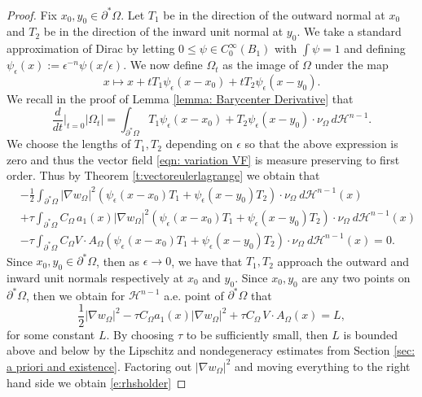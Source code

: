 \documentclass[10pt, reqno]{amsart}
\numberwithin{equation}{section}
\def\W{\Omega}
\begin{document}
\begin{proof}
 Fix $x_0,y_0 \in \partial^* \W$. Let $T_1$ be in the direction of the outward normal at $x_0$ and $T_2$ be in the direction of the inward unit normal at $y_0$. We take a standard approximation of Dirac by letting  $0\leq \psi \in C_0^{\infty}(B_1)$ with
 $\int \psi =1$ and defining $\psi_{\epsilon}(x):=\epsilon^{-n} \psi(x/\epsilon)$. We now define $\Omega_t$ as the image of $\Omega$ under the map
 \begin{equation}
     \label{eqn: variation VF}
 x \mapsto x + tT_1 \psi_{\epsilon}(x-x_0)+tT_2\psi_{\epsilon}(x-y_0). 
 \end{equation}
 We recall in the proof of Lemma \ref{lemma: Barycenter Derivative} that 
 \[
 \frac{d}{d t}\Big|_{t=0}|\Omega_t|  =\int_{\partial^* \Omega} T_1 \psi_{\epsilon}(x-x_0)+T_2\psi_{\epsilon}(x-y_0) \cdot \nu_{\Omega} \, d \mathcal{H}^{n-1}.
 \]
 We choose the lengths of $T_1,T_2$ depending on $\epsilon$ so that the above expression is zero and thus the vector field \eqref{eqn: variation VF} is measure preserving to first order. 
  Thus by Theorem \ref{t:vectoreulerlagrange} we obtain that 
  \[
  \begin{aligned}
 &-\frac{1}{2} \int_{\partial^* \W} |\nabla w_{\Omega}|^2 (\psi_{\epsilon}(x-x_0)T_1 +\psi_{\epsilon}(x-y_0)T_2)\cdot \nu_{\W} \ d \mathcal{H}^{n-1}(x) \\
 &+\tau \int_{\partial^* \W}  C_{\Omega} \, a_1(x)|\nabla w_{\W}|^2 (\psi_{\epsilon}(x-x_0)T_1 +\psi_{\epsilon}(x-y_0)T_2)\cdot \nu_{\W} \ d \mathcal{H}^{n-1}(x)\\
 &- \tau\int_{\partial^* \W}  C_{\Omega} V\cdot A_{\W} (\psi_{\epsilon}(x-x_0)T_1 +\psi_{\epsilon}(x-y_0)T_2)\cdot \nu_{\W} \ d \mathcal{H}^{n-1}(x) =0. 
 \end{aligned}
 \]
 Since $x_0,y_0 \in \partial^* \W$, then as $\epsilon \to 0$, we have that $T_1,T_2$ approach the outward and inward unit normals respectively at $x_0$ and $y_0$. Since $x_0,y_0$ are any two points on $\partial^* \W$, then we obtain for $\mathcal{H}^{n-1}$ a.e. point of $\partial^* \W$ that  
 \[
 \frac{1}{2}|\nabla w_{\W}|^2  -\tau C_\W a_1(x) |\nabla w_{\W}|^2+\tau C_\W \, V \cdot A_{\W}(x)  =L, 
 \]
 for some constant $L$. By choosing $\tau$ to be sufficiently small, then $L$ is bounded above and below by the Lipschitz and nondegeneracy estimates from Section \ref{sec: a priori and existence}. Factoring out $|\nabla w_{\W}|^2$ and moving everything to the right hand side we obtain \eqref{e:rhsholder}
\end{proof}
\end{document}
